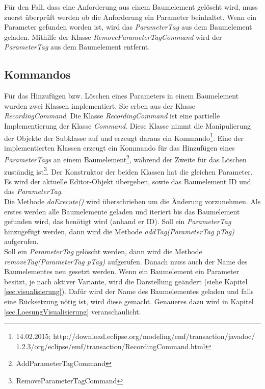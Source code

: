 Für den Fall, dass eine Anforderung aus einem Baumelement gelöscht wird, muss zuerst überprüft werden ob die Anforderung ein Parameter beinhaltet. Wenn ein Parameter gefunden worden ist, wird das \textit{ParameterTag} aus dem Baumelement geladen. Mithilfe der Klasse \textit{RemoveParameterTagCommand} wird der \textit{ParameterTag} aus dem Baumelement entfernt.

\subsection{Kommandos}\label{sub.Command}
Für das Hinzufügen bzw. Löschen eines Parameters in einem Baumelement wurden zwei Klassen implementiert. Sie erben aus der Klasse \textit{RecordingCommand}. Die Klasse \textit{RecordingCommand} ist eine partielle Implementierung der Klasse \textit{Command}. Diese Klasse nimmt die  Manipulierung der Objekte der Subklasse auf und erzeugt daraus ein Kommando\footnote{14.02.2015; http://download.eclipse.org/modeling/emf/transaction/javadoc/ 1.2.3/org/eclipse/emf/transaction/RecordingCommand.html}. Eine der implementierten Klassen erzeugt ein Kommando für das Hinzufügen eines \textit{ParameterTags} an einem Baumelement\footnote{AddParameterTagCommand}, während der Zweite für das Löschen zuständig ist\footnote{RemoveParameterTagCommand}. Der Konstruktor der beiden Klassen hat die gleichen Parameter. Es wird der aktuelle Editor-Objekt übergeben, sowie das Baumelement ID und das \textit{ParameterTag}.\\


Die Methode \textit{doExecute()} wird überschrieben um die Änderung vorzunehmen. Als erstes werden alle Baumelemente geladen und iteriert bis das Baumelement gefunden wird, das benötigt wird (anhand er ID). Soll ein \textit{ParameterTag} hinzugefügt werden, dann wird die Methode \textit{addTag(ParameterTag pTag)} aufgerufen.\\


Soll ein \textit{ParameterTag} gelöscht werden, dann wird die Methode \textit{removeTag(ParameterTag pTag)} aufgerufen. Danach muss auch der Name des Baumelementes neu gesetzt werden. Wenn ein Baumelement ein Parameter besitzt, je nach aktiver Variante, wird die Darstellung geändert (siehe Kapitel \ref{sec.visualisierung}). Dafür wird der Name des Baumelementes geladen und falls eine Rücksetzung nötig ist, wird diese gemacht. Genaueres dazu wird in Kapitel \ref{sec.LoesungVisualisierung} veranschaulicht.\\

